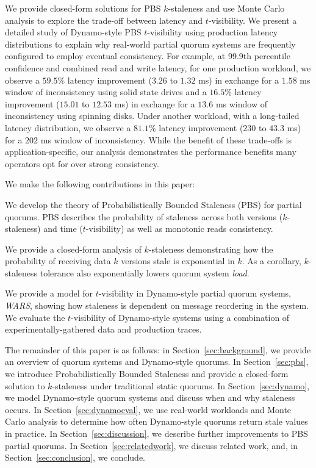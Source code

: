 \documentclass{vldb}
\begin{document}
We provide closed-form solutions for PBS $k$-staleness and use Monte
Carlo analysis to explore the trade-off between latency and $t$-visibility.
We present a detailed study of Dynamo-style PBS $t$-visibility using
production latency distributions to explain why real-world partial
quorum systems are frequently configured to employ eventual
consistency. For example, at 99.9th percentile confidence and combined
read and write latency, for one production workload, we observe a
$59.5\%$ latency improvement ($3.26$ to $1.32$ ms) in exchange for a
$1.58$ ms window of inconsistency using solid state drives and a
$16.5\%$ latency improvement ($15.01$ to $12.53$ ms) in exchange for a
$13.6$ ms window of inconsistency using spinning disks.  Under another
workload, with a long-tailed latency distribution, we observe a
$81.1\%$ latency improvement ($230$ to $43.3$ ms) for a $202$ ms
window of inconsistency.  While the benefit of these trade-offs is
application-specific, our analysis demonstrates the performance
benefits many operators opt for over strong consistency.

We make the following contributions in this paper:

\begin{itemize*}

\item We develop the theory of Probabilistically Bounded Staleness
  (PBS) for partial quorums. PBS describes the probability of
  staleness across both versions ($k$-staleness) and time
  ($t$-visibility) as well as monotonic reads consistency.

\item We provide a closed-form analysis of $k$-staleness demonstrating
  how the probability of receiving data $k$ versions stale is
  exponential in $k$.  As a corollary, $k$-staleness tolerance also
  exponentially lowers quorum system \textit{load}.

\item We provide a model for $t$-visibility in
  Dynamo-style partial quorum systems, \textit{WARS},  showing how
  staleness is dependent on message reordering in the system.  We
  evaluate the $t$-visibility of Dynamo-style systems using a
  combination of experimentally-gathered data and production traces.

\end{itemize*}

The remainder of this paper is as follows: in
Section~\ref{sec:background}, we provide an overview of quorum systems
and Dynamo-style quorums.  In Section~\ref{sec:pbs}, we introduce
Probabilistically Bounded Staleness and provide a closed-form solution
to $k$-staleness under traditional static quorums.  In
Section~\ref{sec:dynamo}, we model Dynamo-style quorum systems and
discuss when and why staleness occurs.  In Section~\ref{sec:dynamoeval}, we
use real-world workloads and Monte Carlo analysis to determine how
often Dynamo-style quorums return stale values in practice.  In
Section~\ref{sec:discussion}, we describe further improvements to
PBS partial quorums. In Section~\ref{sec:relatedwork}, we discuss
related work, and, in Section~\ref{sec:conclusion}, we conclude.
\end{document}
